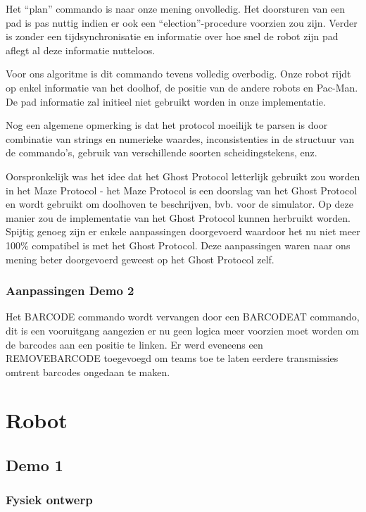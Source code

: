 \documentclass[12pt,a4paper]{report}
\begin{document}
Het ``plan'' commando is naar onze mening onvolledig. Het doorsturen van een pad is pas nuttig indien er ook een ``election''-procedure voorzien zou zijn. Verder is zonder een tijdsynchronisatie en informatie over hoe snel de robot zijn pad aflegt al deze informatie nutteloos.

Voor ons algoritme is dit commando tevens volledig overbodig. Onze robot rijdt op enkel informatie van het doolhof, de positie van de andere robots en Pac-Man. De pad informatie zal initieel niet gebruikt worden in onze implementatie.

Nog een algemene opmerking is dat het protocol moeilijk te parsen is door combinatie van strings en numerieke waardes, inconsistenties in de structuur van de commando's, gebruik van verschillende soorten scheidingstekens, enz.

Oorspronkelijk was het idee dat het Ghost Protocol letterlijk gebruikt zou worden in het Maze Protocol - het Maze Protocol is een doorslag van het Ghost Protocol en wordt gebruikt om doolhoven te beschrijven, bvb. voor de simulator. Op deze manier zou de implementatie van het Ghost Protocol kunnen herbruikt worden. Spijtig genoeg zijn er enkele aanpassingen doorgevoerd waardoor het nu niet meer 100\% compatibel is met het Ghost Protocol. Deze aanpassingen waren naar ons mening beter doorgevoerd geweest op het Ghost Protocol zelf.

\subsection{Aanpassingen Demo 2}

Het BARCODE commando wordt vervangen door een BARCODEAT commando, dit is een vooruitgang aangezien er nu geen logica meer voorzien moet worden om de barcodes aan een positie te linken. 
Er werd eveneens een REMOVEBARCODE toegevoegd om teams toe te laten eerdere transmissies omtrent barcodes ongedaan te maken.


\chapter{Robot}

\section{Demo 1}

\subsection{Fysiek ontwerp}
\end{document}

